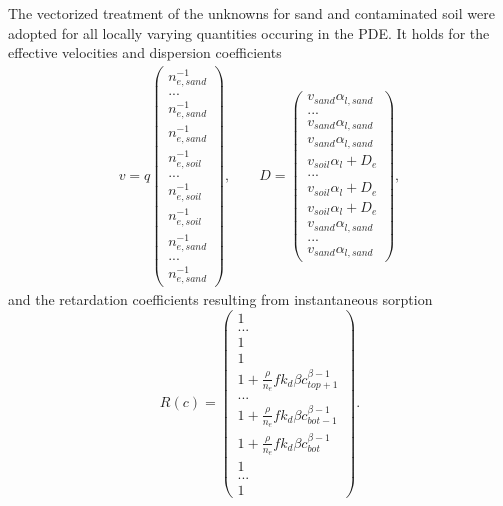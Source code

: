 The vectorized treatment of the unknowns for sand and contaminated soil were adopted for all locally varying quantities occuring in the PDE. It holds for the effective velocities and dispersion coefficients
\begin{align}
    v = q \left(\begin{matrix}  n_{e, sand}^{-1}\\ ...\\n_{e, sand}^{-1}\\n_{e, sand}^{-1}\\n_{e, soil}^{-1}\\...\\n_{e, soil}^{-1}\\n_{e, soil}^{-1}\\n_{e, sand}^{-1}\\
    ...\\n_{e, sand}^{-1} \end{matrix}\right), \quad \quad D = \left(\begin{matrix} v_{sand} \alpha_{l,sand}\\ ...\\v_{sand}\alpha_{l,sand}\\v_{sand}\alpha_{l,sand}\\v_{soil}\alpha_{l}+D_e\\...\\v_{soil}\alpha_{l}+D_e\\v_{soil}\alpha_{l}+D_e\\v_{sand}\alpha_{l,sand}\\
...\\ v_{sand}\alpha_{l,sand} \end{matrix}\right),
\end{align}
and the retardation coefficients resulting from instantaneous sorption
\begin{equation}
    R(c) = \left(\begin{matrix}  1\\ ...\\1\\1\\1 + \frac{\rho}{n_e}fk_d\beta c^{\beta-1}_{top+1}\\...\\1 + \frac{\rho}{n_e}fk_d\beta c^{\beta-1}_{bot-1}\\1 + \frac{\rho}{n_e}fk_d\beta c^{\beta-1}_{bot}\\1\\
    ...\\1\end{matrix}\right).
    \label{eq:ret_sand}
\end{equation}
